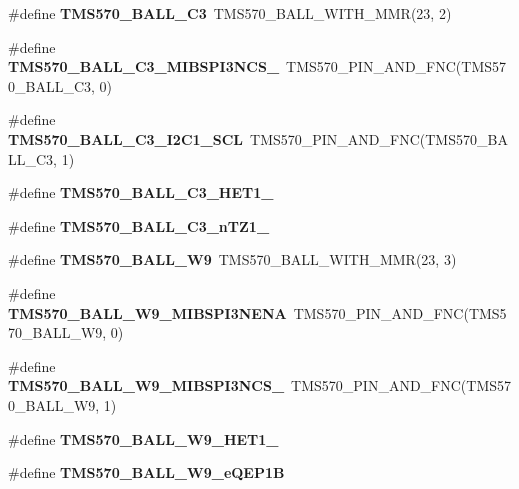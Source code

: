 \begin{DoxyCompactItemize}
\#define {\bfseries T\+M\+S570\+\_\+\+B\+A\+L\+L\+\_\+\+C3}~T\+M\+S570\+\_\+\+B\+A\+L\+L\+\_\+\+W\+I\+T\+H\+\_\+\+M\+MR(23, 2)
\item 
\mbox{\label{tms570lc4357-pins_8h_ae1d5faec7b384610b369792246db0a12}} 
\#define {\bfseries T\+M\+S570\+\_\+\+B\+A\+L\+L\+\_\+\+C3\+\_\+\+M\+I\+B\+S\+P\+I3\+N\+C\+S\+\_}~T\+M\+S570\+\_\+\+P\+I\+N\+\_\+\+A\+N\+D\+\_\+\+F\+NC(T\+M\+S570\+\_\+\+B\+A\+L\+L\+\_\+\+C3, 0)
\item 
\mbox{\label{tms570lc4357-pins_8h_a2f10536e4fc7beacf009d93d78b9e7cd}} 
\#define {\bfseries T\+M\+S570\+\_\+\+B\+A\+L\+L\+\_\+\+C3\+\_\+\+I2\+C1\+\_\+\+S\+CL}~T\+M\+S570\+\_\+\+P\+I\+N\+\_\+\+A\+N\+D\+\_\+\+F\+NC(T\+M\+S570\+\_\+\+B\+A\+L\+L\+\_\+\+C3, 1)
\item 
\#define {\bfseries T\+M\+S570\+\_\+\+B\+A\+L\+L\+\_\+\+C3\+\_\+\+H\+E\+T1\+\_}
\item 
\#define {\bfseries T\+M\+S570\+\_\+\+B\+A\+L\+L\+\_\+\+C3\+\_\+n\+T\+Z1\+\_}
\item 
\mbox{\label{tms570lc4357-pins_8h_a2ecbe71d7ef160f4581b1531c353ec3d}} 
\#define {\bfseries T\+M\+S570\+\_\+\+B\+A\+L\+L\+\_\+\+W9}~T\+M\+S570\+\_\+\+B\+A\+L\+L\+\_\+\+W\+I\+T\+H\+\_\+\+M\+MR(23, 3)
\item 
\mbox{\label{tms570lc4357-pins_8h_aed32e5fcc1a3627fa3c98c7d481aef69}} 
\#define {\bfseries T\+M\+S570\+\_\+\+B\+A\+L\+L\+\_\+\+W9\+\_\+\+M\+I\+B\+S\+P\+I3\+N\+E\+NA}~T\+M\+S570\+\_\+\+P\+I\+N\+\_\+\+A\+N\+D\+\_\+\+F\+NC(T\+M\+S570\+\_\+\+B\+A\+L\+L\+\_\+\+W9, 0)
\item 
\mbox{\label{tms570lc4357-pins_8h_abb834fe4d84a05e0cba6c0ca2b4d6c70}} 
\#define {\bfseries T\+M\+S570\+\_\+\+B\+A\+L\+L\+\_\+\+W9\+\_\+\+M\+I\+B\+S\+P\+I3\+N\+C\+S\+\_}~T\+M\+S570\+\_\+\+P\+I\+N\+\_\+\+A\+N\+D\+\_\+\+F\+NC(T\+M\+S570\+\_\+\+B\+A\+L\+L\+\_\+\+W9, 1)
\item 
\#define {\bfseries T\+M\+S570\+\_\+\+B\+A\+L\+L\+\_\+\+W9\+\_\+\+H\+E\+T1\+\_}
\item 
\#define {\bfseries T\+M\+S570\+\_\+\+B\+A\+L\+L\+\_\+\+W9\+\_\+e\+Q\+E\+P1B}
\item 
\mbox{\label{tms570lc4357-pins_8h_a26d3455c153b71f498f668f5622a469e}} 

\end{DoxyCompactItemize}
